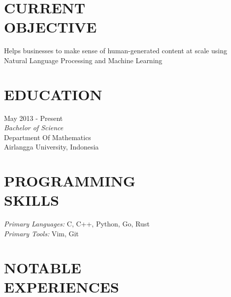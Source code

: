 \documentclass[margin, 10pt]{res} %
\begin{document}
\begin{resume}

 \section{CURRENT\\OBJECTIVE}

Helps businesses to make sense of human-generated content at scale using Natural Language Processing
and Machine Learning


\section{EDUCATION}

May 2013 - Present \\
{\sl Bachelor of Science} \\
Department Of Mathematics \\
Airlangga University, Indonesia
 

\section{PROGRAMMING\\ SKILLS} 

{\sl Primary Languages:} C, C++, Python, Go, Rust \\
{\sl Primary Tools:} Vim, Git
 
 
\section{NOTABLE\\EXPERIENCES}


\end{resume}
\end{document}
